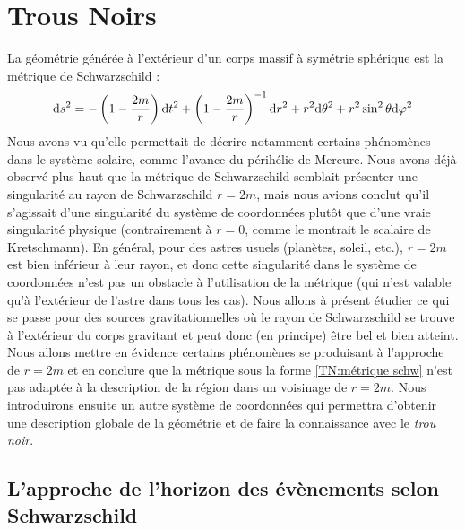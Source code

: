 \chapter{Trous Noirs}
La géométrie générée à l'extérieur d'un corps massif à symétrie sphérique est la métrique de Schwarzschild :
\begin{align}
    \label{TN:métrique schw}
    \mathrm{d} s^2 = - \left( 1 - \frac{2m}{r} \right) \mathrm{d} t^2 + \left( 1 - \frac{2m}{r} \right)^{-1} \mathrm{d} r^2 + r^2 \mathrm{d} \theta^2 + r^2 \sin^2\theta \mathrm{d} \varphi^2
\end{align}
Nous avons vu qu'elle permettait de décrire notamment certains phénomènes dans le système solaire, comme l'avance du périhélie de Mercure. Nous avons déjà observé plus haut que la métrique de Schwarzschild semblait présenter une singularité au rayon de Schwarzschild $r=2m$, mais nous avions conclut qu'il s'agissait d'une singularité du système de coordonnées plutôt que d'une vraie singularité physique (contrairement à $r =0$, comme le montrait le scalaire de Kretschmann). En général, pour des astres usuels (planètes, soleil, etc.), $r=2m$ est bien inférieur à leur rayon, et donc cette singularité dans le système de coordonnées n'est pas un obstacle à l'utilisation de la métrique (qui n'est valable qu'à l'extérieur de l'astre dans tous les cas). Nous allons à présent étudier ce qui se passe pour des sources gravitationnelles où le rayon de Schwarzschild se trouve à l'extérieur du corps gravitant et peut donc (en principe) être bel et bien atteint. Nous allons mettre en évidence certains phénomènes se produisant à l'approche de $r=2m$ et en conclure que la métrique sous la forme \ref{TN:métrique schw} n'est pas adaptée à la description de la région dans un voisinage de $r=2m$. Nous introduirons ensuite un autre système de coordonnées qui permettra d'obtenir une description globale de la géométrie et de faire la connaissance avec le \emph{trou noir}.
\section{L'approche de l'horizon des évènements selon Schwarzschild}
